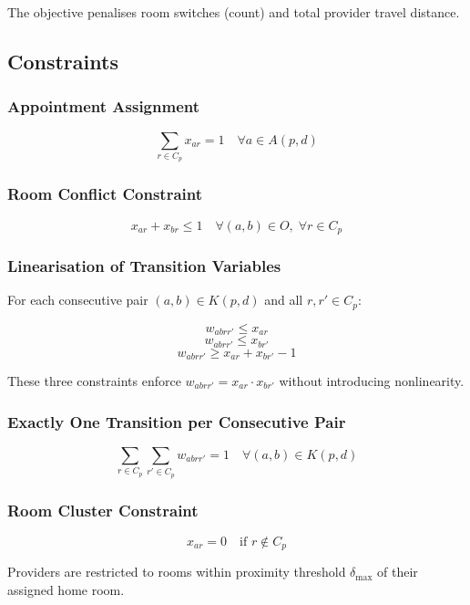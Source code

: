 \documentclass[12pt]{article}
\begin{document}
The objective penalises room switches (count) and total provider travel distance.

\subsection*{Constraints}

\subsubsection*{Appointment Assignment}

\[
\sum_{r \in C_p} x_{ar} = 1 \quad \forall a \in A(p,d)
\]

\subsubsection*{Room Conflict Constraint}

\[
x_{ar} + x_{br} \le 1 \quad \forall (a,b) \in O,\; \forall r \in C_p
\]

\subsubsection*{Linearisation of Transition Variables}

For each consecutive pair $(a,b) \in K(p,d)$ and all $r, r' \in C_p$:

\[
w_{ab r r'} \le x_{ar} \tag{L1}
\]
\[
w_{ab r r'} \le x_{br'} \tag{L2}
\]
\[
w_{ab r r'} \ge x_{ar} + x_{br'} - 1 \tag{L3}
\]

These three constraints enforce $w_{ab r r'} = x_{ar} \cdot x_{br'}$ without
introducing nonlinearity.

\subsubsection*{Exactly One Transition per Consecutive Pair}

\[
\sum_{r \in C_p} \sum_{r' \in C_p} w_{ab r r'} = 1 \quad \forall (a,b) \in K(p,d)
\]

\subsubsection*{Room Cluster Constraint}

\[
x_{ar} = 0 \quad \text{if } r \notin C_p
\]

Providers are restricted to rooms within proximity threshold $\delta_{\max}$ of their
assigned home room.
\end{document}
